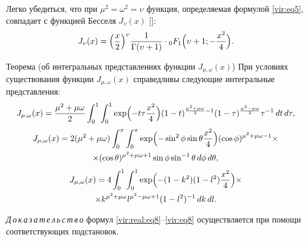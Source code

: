 Легко убедиться, что при $\mu ^2=\omega ^2=\upsilon $ функция, определяемая формулой \eqref{vir:eq5}, совпадает с функцией  Бесселя $J_\upsilon ( x)$ []:
\[
J_\upsilon ( x )=\Bigl(\frac{x}{2}\Bigr)^\upsilon \frac{1}{\Gamma ( \upsilon +1)}\cdot { }_0 F_1 \Bigl(\upsilon 
+1; -\frac{x^2}{4} \Bigr).
\]

\smallskip
{}

\begin{newthm}{Теорема (об интегральных представлениях функции $J_{\mu ,\omega } ( x)$)}
При условиях существования функции $J_{\mu ,\omega } ( x )$ справедливы следующие интегральные представления{\/\rm:}
\begin{equation}
\label{vir:real:eq8}
J_{\mu ,\omega } ( x )=
\frac{\mu ^2+\mu \omega }{2}
\int_0^1 \int_0^1 
\exp\Bigl({-t\tau \frac{x^2}4}\Bigr) 
(1-t)   ^{\frac{\mu ^2+\mu \omega }{2}-1} 
(1-\tau)^{\frac{\mu ^2-\mu \omega }{2}}\tau ^{-1} \, dt \,d\tau ,
\end{equation}
\begin{multline}
\label{vir:eq8}
J_{\mu ,\omega } ( x )=2 (\mu ^2+\mu \omega ) \int_0^\pi \int _0^\pi 
\exp\Bigl(-\sin ^2\phi \sin \theta \frac{x^2}{4}\Bigr) ( \cos \phi )^{\mu ^2+\mu \omega -1}\times \\
\times ( \cos \theta )^{\mu ^2+\mu \omega +1}\sin \phi \sin ^{-1}\theta \, d\phi \,d\theta,
\end{multline}
\begin{multline}
\label{vir:eq8}
J_{\mu ,\omega } ( x )=4\int_0^1 \int _0^1 
\exp\Bigl(-( 1-k^2)(1-l^2)\frac{x^2}{4}\Bigr) \times \\ 
\times
k^{\mu ^2+\mu  \omega } l^{\mu ^2-\mu \omega +1} ( 1-l^2)^{-1}\, dk\, dl. 
\end{multline}
\end{newthm}

\smallskip

{\it Д\,о\,к\,а\,з\,а\,т\,е\,л\,ь\,с\,т\,в\,о\/} формул \eqref{vir:real:eq8}--\eqref{vir:eq8} осуществляется при помощи соответствующих  подстановок.

